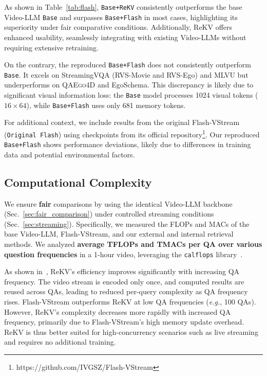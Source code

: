 As shown in Table~\ref{tab:flash}, \texttt{Base+ReKV} consistently outperforms the base Video-LLM \texttt{Base} and surpasses \texttt{Base+Flash} in most cases, highlighting its superiority under fair comparative conditions.
Additionally, ReKV offers enhanced usability, seamlessly integrating with existing Video-LLMs without requiring extensive retraining.

On the contrary, the reproduced \texttt{Base+Flash} does not consistently outperform \texttt{Base}. It excels on StreamingVQA (RVS-Movie and RVS-Ego) and MLVU but underperforms on \textsc{QAEgo4D} and EgoSchema.
This discrepancy is likely due to significant visual information loss: the \texttt{Base} model processes 1024 visual tokens ($16\times64$), while \texttt{Base+Flash} uses only 681 memory tokens.

For additional context, we include results from the original Flash-VStream (\texttt{Original Flash}) using checkpoints from its official repository\footnote{https://github.com/IVGSZ/Flash-VStream}.
Our reproduced \texttt{Base+Flash} shows performance deviations, likely due to differences in training data and potential environmental factors.

\subsection{Computational Complexity}

We ensure \textbf{fair} comparisons by using the identical Video-LLM backbone (Sec.~\ref{sec:fair_comparison}) under controlled streaming conditions (Sec.~\ref{sec:streaming}). Specifically, we measured the FLOPs and MACs of the base Video-LLM, Flash-VStream, and our external and internal retrieval methods. We analyzed \textbf{average TFLOPs and TMACs per QA over various question frequencies} in a 1-hour video, leveraging the \texttt{calflops} library~\citep{ye2023calflops}.

As shown in~, ReKV’s efficiency improves significantly with increasing QA frequency.
The video stream is encoded only once, and computed results are reused across QAs, leading to reduced per-query complexity as QA frequency rises.
Flash-VStream outperforms ReKV at low QA frequencies (\textit{e.g.}, 100 QAs). However, ReKV’s complexity decreases more rapidly with increased QA frequency, primarily due to Flash-VStream’s high memory update overhead.
ReKV is thus better suited for high-concurrency scenarios such as live streaming and requires no additional training.

